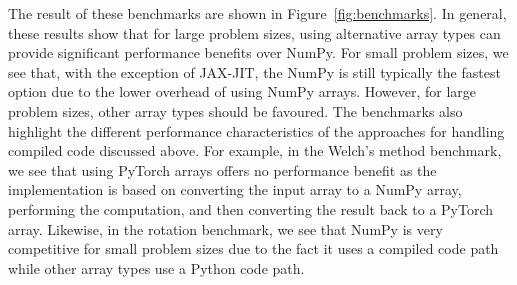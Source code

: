 \documentclass[acmsmall]{acmart}
\begin{document}
The result of these benchmarks are shown in Figure~\ref{fig:benchmarks}. In general,
these results show that for large problem sizes, using alternative array types can
provide significant performance benefits over NumPy. For small problem sizes, we see
that, with the exception of JAX-JIT, the NumPy is still typically the fastest option due
to the lower overhead of using NumPy arrays. However, for large problem sizes, other
array types should be favoured. The benchmarks also highlight the different performance
characteristics of the approaches for handling compiled code discussed above.
For example, in the Welch's method benchmark, we see that using PyTorch arrays offers
no performance benefit as the implementation is based on converting the input array to a
NumPy array, performing the computation, and then converting the result back to a
PyTorch array. Likewise, in the rotation benchmark, we see that NumPy is very
competitive for small problem sizes due to the fact it uses a compiled code path while
other array types use a Python code path.
\end{document}
